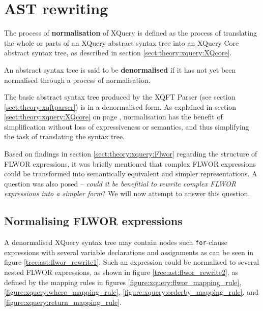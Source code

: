 \section{AST rewriting}
\label{sect:method:ast_rewrite}
\begin{myDefinition}
\label{definition:normalisation}
The process of \textbf{normalisation} of XQuery is defined as the process of
translating the whole or parts of an XQuery abstract syntax tree into an XQuery Core abstract
syntax tree, as described in section \ref{sect:theory:xquery:XQcore}.
\end{myDefinition}

\begin{myDefinition}
\label{definition:denormalised}
An abstract syntax tree is said to be \textbf{denormalised} if it has not yet
been normalised through a process of normalisation.
\end{myDefinition}

The basic abstract syntax tree produced by the XQFT Parser (see section
\ref{sect:theory:xqftparser}) is in a denormalised form. As explained in
section \ref{sect:theory:xquery:XQcore} on page
\pageref{sect:theory:xquery:XQcore}, normalisation has the benefit of
simplification without loss of expressiveness or semantics, and thus
simplifying the task of translating the syntax tree.

Based on findings in section \ref{sect:theory:xquery:Flwor} regarding the
structure of FLWOR expressions, it was briefly mentioned that complex FLWOR
expressions could be transformed into semantically equivalent and simpler
representations. A question was also posed -- \emph{could it be
benefitial to rewrite complex FLWOR expressions into a simpler form}? We will
now attempt to answer this question.

\subsection{Normalising FLWOR expressions}
A denormalised XQuery syntax tree may contain nodes such \texttt{for}-clause expressions with several variable
declarations and assignments as can be seen in figure \ref{tree:ast:flwor_rewrite1}. Such an expression could be
normalised to several nested FLWOR expressions, as shown in figure \ref{tree:ast:flwor_rewrite2}, as defined by
the mapping rules in figures \ref{figure:xquery:flwor_mapping_rule},
\ref{figure:xquery:where_mapping_rule},
\ref{figure:xquery:orderby_mapping_rule}, and
\ref{figure:xquery:return_mapping_rule}.

